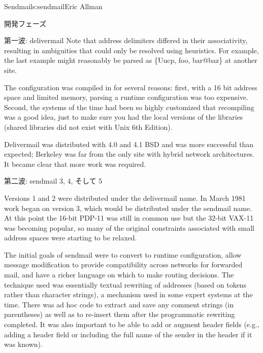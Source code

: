 \begin{aosachapter}{Sendmail}{s:sendmail}{Eric Allman}
\begin{aosasect1}{開発フェーズ}
\begin{aosasect2}{第一波: delivermail}
\noindent
Note that address delimiters differed in their associativity,
resulting in ambiguities that could only be resolved using heuristics.
For example, the last example might reasonably be parsed as
\{Uucp, foo, bar@baz\} 
at another site.

The configuration was compiled in for several reasons: first, with a
16 bit address space and limited memory, parsing a runtime
configuration was too expensive. Second, the systems of the time had
been so highly customized that recompiling was a good idea, just to
make sure you had the local versions of the libraries (shared
libraries did not exist with Unix 6th Edition).

Delivermail was distributed with 4.0 and 4.1 BSD and was more
successful than expected; Berkeley was far from the only site with
hybrid network architectures.  It became clear that more work was
required.

\end{aosasect2}

\begin{aosasect2}{第二波: sendmail 3, 4, そして 5}

Versions 1 and 2 were distributed under the delivermail name. In March
1981 work began on version 3, which would be distributed under the
sendmail name. At this point the 16-bit PDP-11 was still in common use
but the 32-bit VAX-11 was becoming popular, so many of the original
constraints associated with small address spaces were starting to be
relaxed.

The initial goals of sendmail were to convert to runtime
configuration, allow message modification to provide compatibility
across networks for forwarded mail, and have a richer language on
which to make routing decisions. The technique used was essentially
textual rewriting of addresses (based on tokens rather than
character strings),
a mechanism used in some expert systems at the time. There was ad hoc
code to extract and save any comment strings (in parentheses) as well
as to re-insert them after the programmatic rewriting completed. It
was also important to be able to add or augment header fields (e.g.,
adding a  header field or including the full name of the
sender in the  header if it was known).


\end{aosasect2}
\end{aosasect1}
\end{aosachapter}
